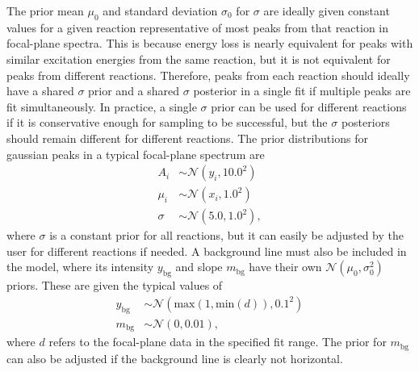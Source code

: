 The prior mean $\mu_{0}$ and standard deviation $\sigma_{0}$ for $\sigma$ are ideally given constant values for a given reaction representative of most peaks from that reaction in focal-plane spectra. This is because energy loss is nearly equivalent for peaks with similar excitation energies from the same reaction, but it is not equivalent for peaks from different reactions. Therefore, peaks from each reaction should ideally have a shared $\sigma$ prior and a shared $\sigma$ posterior in a single fit if multiple peaks are fit simultaneously. In practice, a single $\sigma$ prior can be used for different reactions if it is conservative enough for sampling to be successful, but the $\sigma$ posteriors should remain different for different reactions. The prior distributions for gaussian peaks in a typical focal-plane spectrum are
\begin{align}
    A_{i} &\sim \mathcal{N}(y_{i}, 10.0^{2}) \nonumber \\
    \mu_{i} &\sim \mathcal{N}(x_{i}, 1.0^{2}) \nonumber \\
    \sigma &\sim \mathcal{N}(5.0, 1.0^{2}), \label{eqn:gaus_priors}
\end{align}
where $\sigma$ is a constant prior for all reactions, but it can easily be adjusted by the user for different reactions if needed. A background line must also be included in the model, where its intensity $y_{\mathrm{bg}}$ and slope $m_{\mathrm{bg}}$ have their own $\mathcal{N}(\mu_{0}, \sigma_{0}^{2})$ priors. These are given the typical values of
\begin{align}
    y_{\mathrm{bg}} &\sim \mathcal{N}(\mathrm{max}(1, \mathrm{min}(d)), 0.1^{2}) \nonumber \\
    m_{\mathrm{bg}} &\sim \mathcal{N}(0, 0.01), \label{eqn:bg_priors}
\end{align}
where $d$ refers to the focal-plane data in the specified fit range. The prior for $m_{\mathrm{bg}}$ can also be adjusted if the background line is clearly not horizontal. 
